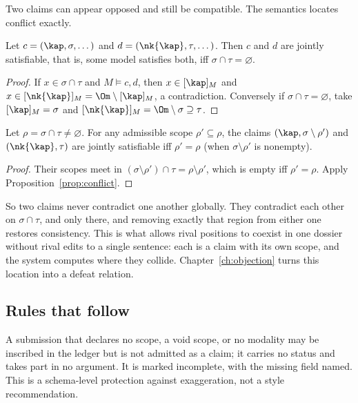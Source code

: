 Two claims can appear opposed and still be compatible. The semantics locates conflict exactly.

\begin{proposition}\label{prop:conflict}
Let $c=(\kap,\sigma,\dots)$ and $d=(\nk{\kap},\tau,\dots)$. Then $c$ and $d$ are jointly satisfiable, that is, some model satisfies both, iff $\sigma\cap\tau=\varnothing$.
\end{proposition}

\begin{proof}
If $x\in\sigma\cap\tau$ and $M\models c,d$, then $x\in[\kap]_M$ and $x\in[\nk{\kap}]_M=\Om\setminus[\kap]_M$, a contradiction. Conversely if $\sigma\cap\tau=\varnothing$, take $[\kap]_M=\sigma$ and $[\nk{\kap}]_M=\Om\setminus\sigma\supseteq\tau$.
\end{proof}

\begin{proposition}\label{prop:localize}
Let $\rho=\sigma\cap\tau\ne\varnothing$. For any admissible scope $\rho'\subseteq\rho$, the claims $(\kap,\sigma\setminus\rho')$ and $(\nk{\kap},\tau)$ are jointly satisfiable iff $\rho'=\rho$ (when $\sigma\setminus\rho'$ is nonempty).
\end{proposition}

\begin{proof}
Their scopes meet in $(\sigma\setminus\rho')\cap\tau=\rho\setminus\rho'$, which is empty iff $\rho'=\rho$. Apply Proposition~\ref{prop:conflict}.
\end{proof}

So two claims never contradict one another globally. They contradict each other on $\sigma\cap\tau$, and only there, and removing exactly that region from either one restores consistency. This is what allows rival positions to coexist in one dossier without rival edits to a single sentence: each is a claim with its own scope, and the system computes where they collide. Chapter~\ref{ch:objection} turns this location into a defeat relation.

\subsection{Rules that follow}

\begin{designrule}\label{rule:scope}
A submission that declares no scope, a void scope, or no modality may be inscribed in the ledger but is not admitted as a claim; it carries no status and takes part in no argument. It is marked incomplete, with the missing field named. This is a schema-level protection against exaggeration, not a style recommendation.
\end{designrule}


